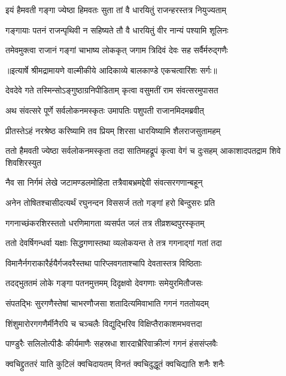 \twolineshloka
{इयं हैमवती गङ्गा ज्येष्ठा हिमवतः सुता}
{तां वै धारयितुं राजन्हरस्तत्र नियुज्यताम्} %

\twolineshloka
{गङ्गायाः पतनं राजन्पृथिवी न सहिष्यते}
{तौ वै धारयितुं वीर नान्यं पश्यामि शूलिनः} %

\twolineshloka
{तमेवमुक्त्वा राजानं गङ्गां चाभाष्य लोककृत्}
{जगाम त्रिदिवं देवः सह सर्वैर्मरुद्गणैः} %


{॥इत्यार्षे श्रीमद्रामायणे वाल्मीकीये आदिकाव्ये बालकाण्डे एकचत्वारिंशः सर्गः॥}


\twolineshloka
{देवदेवे गते तस्मिन्सोऽङ्गुष्ठाग्रनिपीडिताम्}
{कृत्वा वसुमतीं राम संवत्सरमुपासत} %

\twolineshloka
{अथ संवत्सरे पूर्णे सर्वलोकनमस्कृतः}
{उमापतिः पशुपती राजानमिदमब्रवीत्} %

\twolineshloka
{प्रीतस्तेऽहं नरश्रेष्ठ करिष्यामि तव प्रियम्}
{शिरसा धारयिष्यामि शैलराजसुतामहम्} %

\threelineshloka
{ततो हैमवती ज्येष्ठा सर्वलोकनमस्कृता}
{तदा सातिमहद्रूपं कृत्वा वेगं च दुःसहम्}
{आकाशादपतद्राम शिवे शिवशिरस्युत} %

\twolineshloka
{नैव सा निर्गमं लेखे जटामण्डलमोहिता}
{तत्रैवाबभ्रमद्देवी संवत्सरगणान्बहून्} %

\twolineshloka
{अनेन तोषितश्चासीदत्यर्थं रघुनन्दन}
{विससर्ज ततो गङ्गां हरो बिन्दुसरः प्रति} %

\twolineshloka
{गगनाच्छंकरशिरस्ततो धरणिमागता}
{व्यसर्पत जलं तत्र तीव्रशब्दपुरस्कृतम्} %

\twolineshloka
{ततो देवर्षिगन्धर्वा यक्षाः सिद्धगणास्तथा}
{व्यलोकयन्त ते तत्र गगनाद्गां गतां तदा} %

\twolineshloka
{विमानैर्नगराकारैर्हयैर्गजवरैस्तथा}
{पारिप्लवगताश्चापि देवतास्तत्र विष्ठिताः} %

\twolineshloka
{तदद्भुततमं लोके गङ्गा पतनमुत्तमम्}
{दिदृक्षवो देवगणाः समेयुरमितौजसः} %

\twolineshloka
{संपतद्भिः सुरगणैस्तेषां चाभरणौजसा}
{शतादित्यमिवाभाति गगनं गततोयदम्} %

\twolineshloka
{शिंशुमारोरगगणैर्मीनैरपि च चञ्चलैः}
{विद्युद्भिरिव विक्षिप्तैराकाशमभवत्तदा} %

\twolineshloka
{पाण्डुरैः सलिलोत्पीडैः कीर्यमाणैः सहस्रधा}
{शारदाभ्रैरिवाक्रीत्णं गगनं हंससंप्लवैः} %

\twolineshloka
{क्वचिद्द्रुततरं याति कुटिलं क्वचिदायतम्}
{विनतं क्वचिदुद्धूतं क्वचिद्याति शनैः शनैः} %

